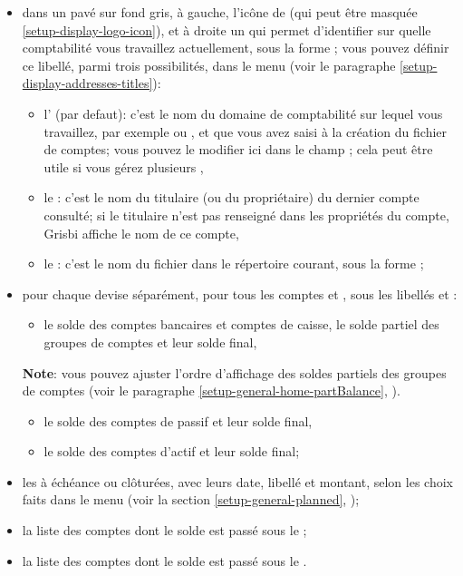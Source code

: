 \begin{itemize}
	 \item dans un pavé sur fond gris, à gauche, l'icône de  (qui peut être masquée \vref{setup-display-logo-icon}), et à droite un  qui permet d'identifier sur quelle comptabilité vous travaillez actuellement, sous la forme ; vous pouvez définir ce libellé, parmi trois possibilités, dans le menu  (voir le paragraphe \vref{setup-display-addresses-titles}):
		\begin{itemize}
			 \item l' (par defaut): c'est le nom du domaine de comptabilité sur lequel vous travaillez, par exemple  ou , et que vous avez saisi à la création du fichier de comptes; vous pouvez le modifier ici dans le champ ; cela peut être utile si vous gérez plusieurs , 
			 \item le : c'est le nom du titulaire (ou du propriétaire) du dernier compte consulté; si le titulaire n'est pas renseigné dans les propriétés du compte, Grisbi affiche le nom de ce compte,
			 \item le : c'est le nom du fichier dans le répertoire courant, sous la forme ;
		\end{itemize}
	 \item pour chaque devise séparément, pour tous les comptes et , sous les libellés  et :
		\begin{itemize}
			 \item le solde des comptes bancaires et comptes de caisse, le solde partiel des groupes de comptes et leur solde final,
		\end{itemize}
			 \textbf{Note}: vous pouvez ajuster l'ordre d'affichage des soldes partiels des groupes de comptes (voir le paragraphe \vref{setup-general-home-partBalance}, ).			 
		\begin{itemize}[resume]
			 \item le solde des comptes de passif et leur solde final,
			 \item le solde des comptes d'actif et leur solde final;
		\end{itemize}
	\item les  à échéance ou clôturées, avec leurs date, libellé et montant, selon les choix faits dans le menu  (voir la section \vref{setup-general-planned}, );
	\item la liste des comptes dont le solde est passé sous le ;
	\item la liste des comptes dont le solde est passé sous le .
\end{itemize}

